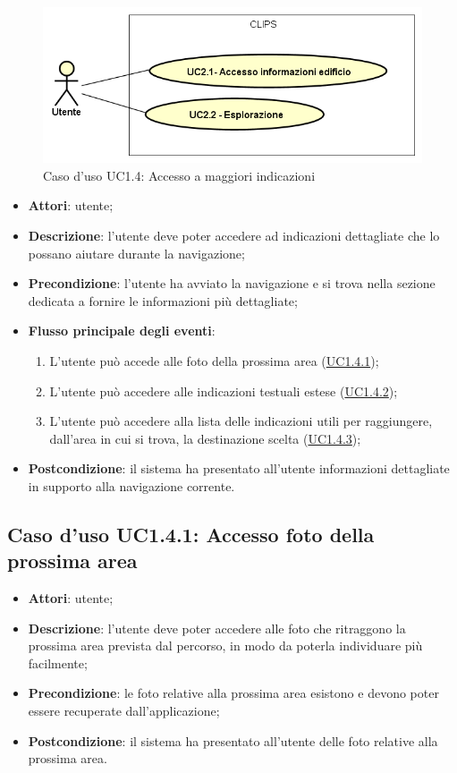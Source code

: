 \documentclass[../AnalisiDeiRequisiti.tex]{subfiles}
\begin{document}
        \begin{figure}[!h]
            \centering
            \includegraphics[scale=0.95, width=\textwidth]{img/UC1-4.png}
            \caption{Caso d'uso UC1.4: Accesso a maggiori indicazioni}\label{fig:UC1.4} 
        \end{figure}
\begin{itemize}
\item \textbf{Attori}: utente;
\item \textbf{Descrizione}: l'utente deve poter accedere ad indicazioni dettagliate che lo possano aiutare durante la navigazione; 
      \item \textbf{Precondizione}: l'utente ha avviato la navigazione e si trova nella sezione dedicata a fornire le informazioni più dettagliate;

        \item \textbf{Flusso principale degli eventi}:
          \begin{enumerate}
          \item L'utente può accede alle foto della prossima area (\hyperlink{UC1.4.1}{UC1.4.1});
          \item L'utente può accedere alle indicazioni testuali estese (\hyperlink{UC1.4.2}{UC1.4.2});
          \item L'utente può accedere alla lista delle indicazioni utili per raggiungere, dall'area in cui si trova, la destinazione scelta (\hyperlink{UC1.4.3}{UC1.4.3});

      \end{enumerate}
    \item \textbf{Postcondizione}: il sistema ha presentato all'utente informazioni dettagliate in supporto alla navigazione corrente.
  \end{itemize}
\hypertarget{UC1.4.1}{}
\subsection{Caso d'uso UC1.4.1: Accesso foto della prossima area}
\begin{itemize}
\item \textbf{Attori}: utente;
\item \textbf{Descrizione}: l'utente deve poter accedere alle foto che ritraggono la prossima area prevista dal percorso, in modo da poterla individuare più facilmente; 
      \item \textbf{Precondizione}: le foto relative alla prossima area esistono e devono poter essere recuperate dall'applicazione;
    \item \textbf{Postcondizione}: il sistema ha presentato all'utente delle foto relative alla prossima area.
  \end{itemize}
\hypertarget{UC1.4.2}{}
\end{document}
